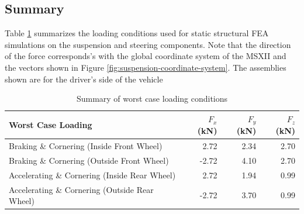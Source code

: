 \documentclass[10pt]{article}
\begin{document}
\subsection{Summary}
Table \ref{tab:worst-case-loading} summarizes the loading conditions used for static structural FEA simulations on the suspension and steering components. Note that the direction of the force corresponds's with the global coordinate system of the MSXII and the vectors shown in Figure \ref{fig:suspension-coordinate-system}. The assemblies shown are for the driver's side of the vehicle

\begin{table}[hbp]
\centering
\caption{Summary of worst case loading conditions}
\label{tab:worst-case-loading}
\begin{tabular}{lrrr}
\toprule
Worst Case Loading                             & $F_x$ (\si{\kilo\newton}) & $F_y$ (\si{\kilo\newton}) & $F_z$ (\si{\kilo\newton}) \\
\midrule
Braking \& Cornering (Inside Front Wheel)      & 2.72                     & 2.34                     & 2.70                     \\
Braking \& Cornering (Outside Front Wheel)     & -2.72                    & 4.10                     & 2.70                     \\
Accelerating \& Cornering (Inside Rear Wheel)  & 2.72                     & 1.94                     & 0.99                     \\
Accelerating \& Cornering (Outside Rear Wheel) & -2.72                    & 3.70                     & 0.99                     \\
\bottomrule
\end{tabular}
\end{table}
\end{document}
